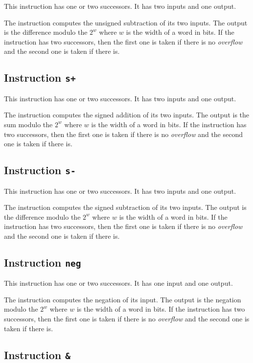 This instruction has one or two successors.  It has two inputs and one
output.

The instruction computes the unsigned subtraction of its two inputs.
The output is the difference modulo the $2^w$ where $w$ is the width
of a word in bits.  If the instruction has two successors, then the
first one is taken if there is no \emph{overflow} and the second one
is taken if there is.

\subsection{Instruction \texttt{s+}}
\label{mir-instruction-s+}

This instruction has one or two successors.  It has two inputs and one
output.

The instruction computes the signed addition of its two inputs.  The
output is the sum modulo the $2^w$ where $w$ is the width of a word in
bits.  If the instruction has two successors, then the first one is
taken if there is no \emph{overflow} and the second one is taken if
there is.  

\subsection{Instruction \texttt{s-}}
\label{mir-instruction-s-}

This instruction has one or two successors.  It has two inputs and one
output.

The instruction computes the signed subtraction of its two inputs.
The output is the difference modulo the $2^w$ where $w$ is the width
of a word in bits.  If the instruction has two successors, then the
first one is taken if there is no \emph{overflow} and the second one
is taken if there is.

\subsection{Instruction \texttt{neg}}
\label{mir-instruction-neg}

This instruction has one or two successors.  It has one input and one
output.

The instruction computes the negation of its input.  The output is the
negation modulo the $2^w$ where $w$ is the width of a word in bits.
If the instruction has two successors, then the first one is taken if
there is no \emph{overflow} and the second one is taken if there is.

\subsection{Instruction \texttt{\&}}
\label{mir-instruction-and}

